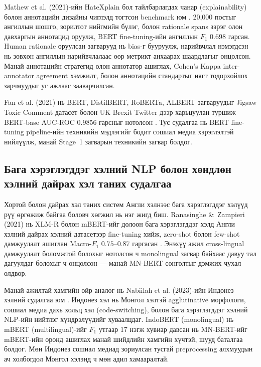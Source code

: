 Mathew et al. (2021)-ийн HateXplain бол тайлбарлагдах чанар (explainability)
болон аннотацийн дизайны чиглэлд тогтсон benchmark юм \cite{mathew2021}. 20,000
постыг ангиллын шошго, зорилтот нийгмийн бүлэг, болон rationale spans зэрэг
олон давхаргын аннотацид оруулж, BERT fine-tuning-ийн ангиллын $F_1$ 0.698
гарсан. Human rationale оруулсан загварууд нь bias-г бууруулж, нарийвчлал
нэмэгдсэн нь зөвхөн ангиллын нарийвчлалаас өөр метрикт анхаарах шаардлагыг
онцолсон. Манай аннотацийн стратегид олон аннотатор ашиглах, Cohen's Kappa
inter-annotator agreement хэмжилт, болон аннотацийн стандартыг нягт тодорхойлох
зарчмуудыг уг ажлаас зааварчилсан.

Fan et al. (2021) нь BERT, DistilBERT, RoBERTa, ALBERT загваруудыг Jigsaw
Toxic Comment датасет болон UK Brexit Twitter дээр харьцуулан туршиж
BERT-base AUC-ROC 0.9856 гарсныг нотолсон \cite{fan2021}. Тус судалгаа нь
BERT fine-tuning pipeline-ийн техникийн мэдлэгийг бодит сошиал медиа
хэрэглэлтэй нийлүүлж, манай Stage~1 загварын техникийн загвар болдог.

\subsection{Бага хэрэглэгддэг хэлний NLP болон хөндлөн хэлний дайрах хэл
таних судалгаа}

Хортой болон дайрах хэл таних систем Англи хэлнээс бага хэрэглэгддэг хэлүүд
рүү өргөжиж байгаа боловч хөгжил нь нэг жигд биш. Ranasinghe \&\ Zampieri
(2021) нь XLM-R болон mBERT-ийг долоон бага хэрэглэгддэг хэлд Англи хэлний
дайрах хэлний датасетээр fine-tuning хийж, zero-shot болон few-shot дамжуулалт
ашиглан Macro-$F_1$ $0.75$--$0.87$ гаргасан \cite{ranasinghe2021}. Энэхүү ажил
cross-lingual дамжуулалт боломжтой болохыг нотолсон ч monolingual загвар
байхаас давуу тал дагуулдаг болохыг ч онцолсон --- манай MN-BERT сонголтыг
дэмжих чухал олдвор.

Манай ажилтай хамгийн ойр аналог нь Nabiilah et al. (2023)-ийн Индонез хэлний
судалгаа юм \cite{nabiilah2023}. Индонез хэл нь Монгол хэлтэй agglutinative
морфологи, сошиал медиа дахь хольц хэл (code-switching), болон бага хэрэглэгддэг
хэлний NLP-ийн нийтлэг хүндрэлүүдийг хуваалцдаг. IndoBERT (monolingual) нь
mBERT (multilingual)-ийг $F_1$ утгаар 17 нэгж хувиар давсан нь MN-BERT-ийг
mBERT-ийн оронд ашиглах манай шийдлийн хамгийн хүчтэй, шууд баталгаа болдог.
Мөн Индонез сошиал медиад зориулсан тусгай preprocessing алхмуудын ач холбогдол
Монгол хэлэнд ч мөн адил хамааралтай.


